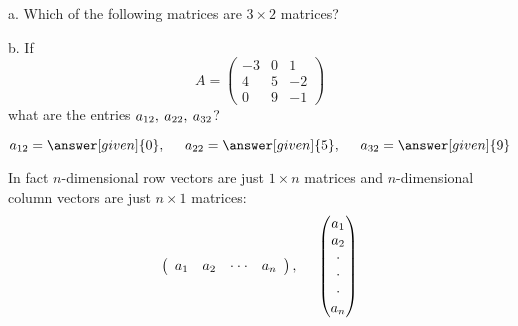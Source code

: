 \documentclass{ximera}
\begin{document}
\begin{question}
  a. Which of the following matrices are $3\times 2$ matrices?
  \begin{multipleChoice}
\end{multipleChoice}
  b. If
  \[A= \left(\begin{array}{ccc}
  -3 & 0 & 1\\
  4 & 5 & -2\\
  0 & 9 & -1
  \end{array}\right)\]
  what are the entries $a_{12},\hspace{.08cm} a_{22}, \hspace{.08cm}a_{32}$?
  \begin{prompt}
  \begin{equation*}
  a_{12} = \answer[given]{0}, \hspace{.5cm} a_{22} = \answer[given]{5}, \hspace{.5cm} a_{32} = \answer[given]{9}
  \end{equation*}
  \end{prompt}
\end{question}
In fact $n$-dimensional row vectors are just $1\times n$ matrices and
$n$-dimensional column vectors are just $n\times 1$ matrices:
\[
\left(\begin{array}{cccc} a_{1} & a_{2} & \cdot \cdot \cdot & a_{n}\end{array}\right), \hspace{.5cm} \begin{pmatrix} a_{1}\\
a_{2}\\
\cdot\\
\cdot\\
\cdot\\
a_{n}\end{pmatrix}
\]
\end{document}
